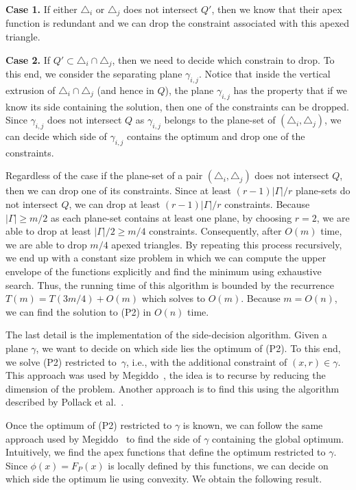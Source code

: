 \documentclass[a4paper,UKenglish]{lipics}
\newcommand{\F}[2]{\ensuremath{F_{\scriptscriptstyle #1}(#2)}}
\begin{document}
\textbf{Case 1.} If either $\triangle_i$ or $\triangle_j$ does not intersect $Q'$, then we know that their apex function is redundant and we can drop the constraint associated with this apexed triangle.

\textbf{Case 2.} If $Q'\subset \triangle_i\cap \triangle_j$, then we need to decide which constrain to drop. 
To this end, we consider the separating plane $\gamma_{i,j}$. Notice that inside the vertical extrusion of $\triangle_i\cap \triangle_j$ (and hence in $Q$), the plane $\gamma_{i,j}$ has the property that if we know its side containing the solution, then one of the constraints can be dropped. Since $\gamma_{i,j}$ does not intersect $Q$ as $\gamma_{i,j}$ belongs to the plane-set of $(\triangle_i, \triangle_j)$, we can decide which side of $\gamma_{i,j}$ contains the optimum and drop one of the constraints.
\vspace{.05in}

Regardless of the case if the plane-set of a pair $(\triangle_i, \triangle_j)$ does not intersect $Q$, then we can drop one of its constraints. Since at least $(r-1)|\Gamma|/r$ plane-sets do not intersect $Q$, we can drop at least $(r-1)|\Gamma|/r$ constraints.
Because $|\Gamma| \geq m/2$ as each plane-set contains at least one plane, by choosing $r = 2$, we are able to drop at least $|\Gamma|/2 \geq m/4$ constraints.
Consequently, after $O(m)$ time, we are able to drop $m/4$ apexed triangles.
By repeating this process recursively, we end up with a constant size problem in which we can compute the upper envelope of the functions explicitly and find the minimum using exhaustive search. 
Thus, the running time of this algorithm is bounded by the recurrence $T(m) = T(3m/4) + O(m)$ which solves to $O(m)$. 
Because $m = O(n)$, we can find the solution to (P2) in $O(n)$ time.

The last detail is the implementation of the side-decision algorithm. 
Given a plane $\gamma$, we want to decide on which side lies the optimum of (P2).
To this end, we solve (P2) restricted to~$\gamma$, i.e., with the additional constraint of $(x,r)\in \gamma$. 
This approach was used by Megiddo~\cite{megiddo1989ball}, the idea is to recurse by reducing the dimension of the problem.
Another approach is to find this using the algorithm described by Pollack et al.~\cite[Section~3]{pollackComputingCenter}. 

Once the optimum of (P2) restricted to $\gamma$ is known, we can follow the same approach used by Megiddo~\cite{megiddo1989ball} to find the side of $\gamma$ containing the global optimum. 
Intuitively, we find the apex functions that define the optimum restricted to $\gamma$. Since $\phi(x) = \F{P}{x}$ is locally defined by this functions, we can decide on which side the optimum lie using convexity.
We obtain the following result.
\end{document}
